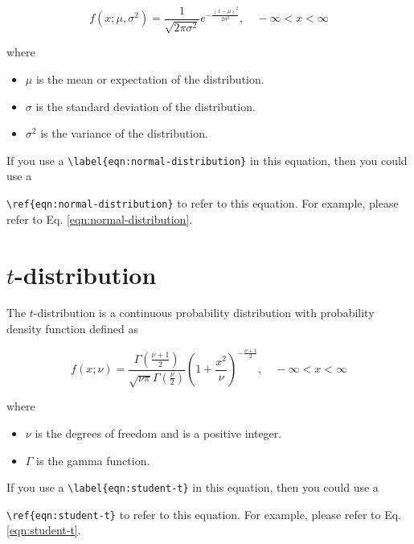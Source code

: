 \documentclass[10pt, a4paper, oneside]{book}
\providecommand{\tightlist}{%
  \setlength{\itemsep}{0pt}\setlength{\parskip}{0pt}}
\begin{document}
\begin{equation}\label{eqn:normal-distribution}
f(x ; \mu, \sigma^{2}) = \frac{1}{\sqrt{2\pi\sigma^{2}}}e^{-\frac{\displaystyle (x - \mu)^{2}}{\displaystyle 2\sigma^{2}}}, \quad -\infty < x < \infty
\end{equation}

where

\begin{itemize}
\tightlist
\item
  \(\mu\) is the mean or expectation of the distribution.
\item
  \(\sigma\) is the standard deviation of the distribution.
\item
  \(\sigma^{2}\) is the variance of the distribution.
\end{itemize}

If you use a \texttt{\textbackslash{}label\{eqn:normal-distribution\}} in this equation, then you could use a

\texttt{\textbackslash{}ref\{eqn:normal-distribution\}} to refer to this equation.
For example, please refer to Eq. \ref{eqn:normal-distribution}.

\section{\texorpdfstring{\(t\)-distribution}{t-distribution}}\label{t-distribution}

The \(t\)-distribution is a continuous probability distribution with probability density function defined as

\begin{equation}\label{eqn:student-t}
f(x ; \nu) = \frac{\Gamma(\frac{\nu+1}{2})}{\sqrt{\nu\pi}\Gamma(\frac{\nu}{2})}
\left( 1 + \frac{x^{2}}{\nu} \right)^{\displaystyle -\frac{\nu+1}{\displaystyle 2}}
, \quad -\infty < x < \infty
\end{equation}

where

\begin{itemize}
\tightlist
\item
  \(\nu\) is the degrees of freedom and is a positive integer.
\item
  \(\Gamma\) is the gamma function.
\end{itemize}

If you use a \texttt{\textbackslash{}label\{eqn:student-t\}} in this equation, then you could use a

\texttt{\textbackslash{}ref\{eqn:student-t\}} to refer to this equation.
For example, please refer to Eq. \ref{eqn:student-t}.
\end{document}
